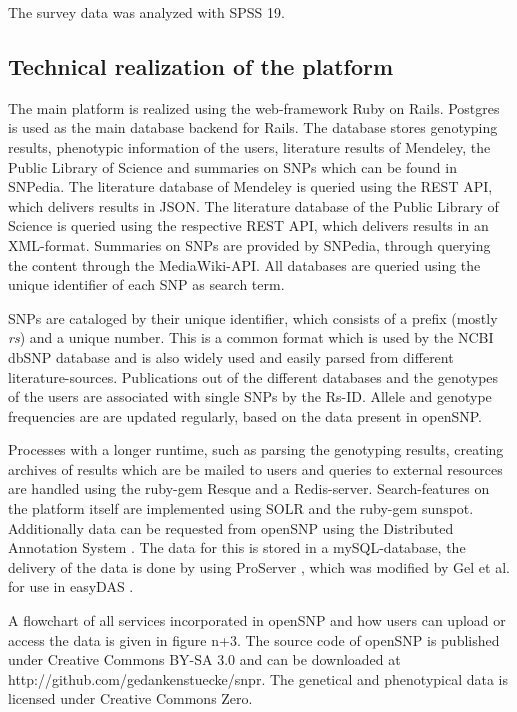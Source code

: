 \documentclass[10pt]{article}
\begin{document}
The survey data was analyzed with SPSS 19. 

\subsection*{Technical realization of the platform}
The main platform is realized using the web-framework Ruby on Rails. Postgres is used as the main database backend for Rails. The database stores genotyping results, phenotypic information of the users, literature results of Mendeley, the Public Library of Science and summaries on SNPs which can be found in SNPedia. The literature database of Mendeley is queried using the REST API, which delivers results in JSON. The literature database of the Public Library of Science is queried using the respective REST API, which delivers results in an XML-format. Summaries on SNPs are provided by SNPedia, through querying the content through the MediaWiki-API. All databases are queried using the unique identifier of each SNP as search term. 

SNPs are cataloged by their unique identifier, which consists of a prefix (mostly \textit{rs}) and a unique number. This is a common format which is used by the NCBI dbSNP database and is also widely used and easily parsed from different literature-sources. Publications out of the different databases and the genotypes of the users are associated with single SNPs by the Rs-ID. Allele and genotype frequencies are are updated regularly, based on the data present in openSNP. 

Processes with a longer runtime, such as parsing the genotyping results, creating archives of results which are be mailed to users and queries to external resources are handled using the ruby-gem Resque and a Redis-server. Search-features on the platform itself are implemented using SOLR and the ruby-gem sunspot. Additionally data can be requested from openSNP using the Distributed Annotation System \cite{Dowell2001,Jenkinson2008}. The data for this is stored in a mySQL-database, the delivery of the data is done by using ProServer \cite{Finn2007}, which was modified by Gel et al. for use in easyDAS \cite{GelMoreno2011}.  

A flowchart of all services incorporated in openSNP and how users can upload or access the data is given in figure n+3. The source code of openSNP is published under Creative Commons BY-SA 3.0 and can be downloaded at http://github.com/gedankenstuecke/snpr. The genetical and phenotypical data is licensed under Creative Commons Zero. 
\end{document}

